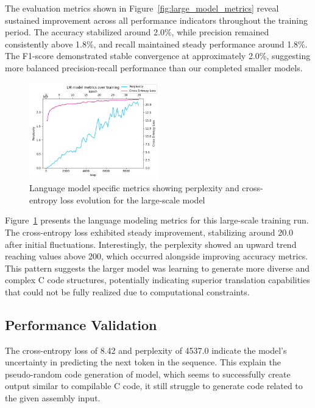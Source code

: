 \documentclass[../main.tex]{subfiles}
\begin{document}
The evaluation metrics shown in Figure~\ref{fig:large_model_metrics} reveal sustained improvement across all performance indicators throughout the training period. The accuracy stabilized around 2.0\%, while precision remained consistently above 1.8\%, and recall maintained steady performance around 1.8\%. The F1-score demonstrated stable convergence at approximately 2.0\%, suggesting more balanced precision-recall performance than our completed smaller models.

\begin{figure}[htbp]
\centering
\includegraphics[width=0.5\textwidth]{images/lm_metrics_per_step.png}
\caption{Language model specific metrics showing perplexity and cross-entropy loss evolution for the large-scale model}
\label{fig:large_model_lm}
\end{figure}

Figure~\ref{fig:large_model_lm} presents the language modeling metrics for this large-scale training run. The cross-entropy loss exhibited steady improvement, stabilizing around 20.0 after initial fluctuations. Interestingly, the perplexity showed an upward trend reaching values above 200, which occurred alongside improving accuracy metrics. This pattern suggests the larger model was learning to generate more diverse and complex C code structures, potentially indicating superior translation capabilities that could not be fully realized due to computational constraints.

\subsection{Performance Validation}

The cross-entropy loss of 8.42 and perplexity of 4537.0 indicate the model's uncertainty in predicting the next token in the sequence. This explain the pseudo-random code generation of model, which seems to successfully create output similar to compilable C code, it still struggle to generate code related to the given assembly input.
\end{document}
